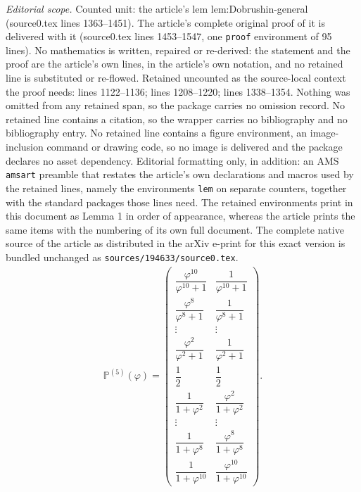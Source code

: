 \documentclass[10pt,a4paper]{amsart}
\begin{document}
\noindent\textit{Editorial scope.} Counted unit: the article's lem lem:Dobrushin-general (source0.tex lines 1363--1451). The article's complete original proof of it is delivered with it (source0.tex lines 1453--1547, one \texttt{proof} environment of 95 lines). No mathematics is written, repaired or re-derived: the statement and the proof are the article's own lines, in the article's own notation, and no retained line is substituted or re-flowed.  Retained uncounted as the source-local context the proof needs: lines 1122--1136; lines 1208--1220; lines 1338--1354.  Nothing was omitted from any retained span, so the package carries no omission record.  No retained line contains a citation, so the wrapper carries no bibliography and no bibliography entry.  No retained line contains a figure environment, an image-inclusion command or drawing code, so no image is delivered and the package declares no asset dependency.  Editorial formatting only, in addition: an AMS \texttt{amsart} preamble that restates the article's own declarations and macros used by the retained lines, namely the environments \texttt{lem} on separate counters, together with the standard packages those lines need.  The retained environments print in this document as Lemma 1 in order of appearance, whereas the article prints the same items with the numbering of its own full document.  The complete native source of the article as distributed in the arXiv e-print for this exact version is bundled unchanged as \texttt{sources/194633/source0.tex}.
\begin{align}\label{eq:StocM-s=5-P}
\mathbb{P}^{(5)}(\varphi)
=
\begin{pmatrix}
\dfrac{\varphi^{10}}{\varphi^{10}+1} & \dfrac{1}{\varphi^{10}+1}\\[4pt]
\dfrac{\varphi^{8}}{\varphi^{8}+1} & \dfrac{1}{\varphi^{8}+1}\\[2pt]
\vdots & \vdots\\[2pt]
\dfrac{\varphi^{2}}{\varphi^{2}+1} & \dfrac{1}{\varphi^{2}+1}\\[4pt]
\dfrac{1}{2} & \dfrac{1}{2}\\[4pt]
\dfrac{1}{1+\varphi^{2}} & \dfrac{\varphi^{2}}{1+\varphi^{2}}\\[2pt]
\vdots & \vdots\\[2pt]
\dfrac{1}{1+\varphi^{8}} & \dfrac{\varphi^{8}}{1+\varphi^{8}}\\[4pt]
\dfrac{1}{1+\varphi^{10}} & \dfrac{\varphi^{10}}{1+\varphi^{10}}
\end{pmatrix}.  
\end{align}
\end{document}

